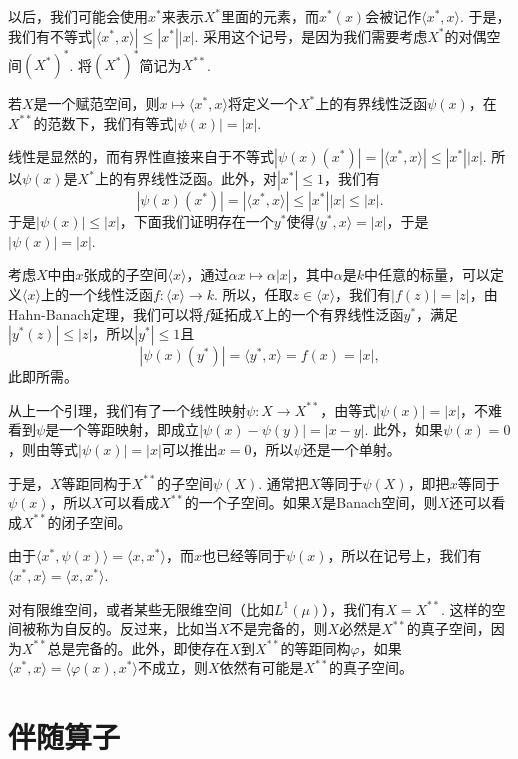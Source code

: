 以后，我们可能会使用$x^*$来表示$X^*$里面的元素，而$x^*(x)$会被记作$\langle x^*,x\rangle$. 于是，我们有不等式$|\langle x^*,x\rangle|\leq |x^*||x|$. 采用这个记号，是因为我们需要考虑$X^*$的对偶空间$(X^*)^*$. 将$(X^*)^*$简记为$X^{**}$.

\begin{lem}
	若$X$是一个赋范空间，则$x\mapsto \langle x^*,x\rangle$将定义一个$X^*$上的有界线性泛函$\psi(x)$，在$X^{**}$的范数下，我们有等式$|\psi(x)|=|x|$.
\end{lem}

线性是显然的，而有界性直接来自于不等式$|\psi(x)(x^*)|=|\langle x^*,x\rangle|\leq |x^*||x|$. 所以$\psi(x)$是$X^*$上的有界线性泛函。此外，对$|x^*|\leq 1$，我们有
\[
	|\psi(x)(x^*)|=|\langle x^*,x\rangle|\leq |x^*||x|\leq |x|.
\]
于是$|\psi(x)|\leq |x|$，下面我们证明存在一个$y^*$使得$\langle y^*,x\rangle=|x|$，于是$|\psi(x)|=|x|$.

考虑$X$中由$x$张成的子空间$\langle x\rangle$，通过$\alpha x\mapsto \alpha|x|$，其中$\alpha$是$k$中任意的标量，可以定义$\langle x\rangle$上的一个线性泛函$f:\langle x\rangle\to k$. 所以，任取$z\in \langle x\rangle$，我们有$|f(z)|=|z|$，由Hahn-Banach定理，我们可以将$f$延拓成$X$上的一个有界线性泛函$y^*$，满足$|y^*(z)|\leq |z|$，所以$|y^*|\leq 1$且
\[
	|\psi(x)(y^*)|=\langle y^*,x\rangle = f(x) =|x|,
\]
此即所需。

\begin{para}
从上一个引理，我们有了一个线性映射$\psi:X\to X^{**}$，由等式$|\psi(x)|=|x|$，不难看到$\psi$是一个等距映射，即成立$|\psi(x)-\psi(y)|=|x-y|$. 此外，如果$\psi(x)=0$，则由等式$|\psi(x)|=|x|$可以推出$x=0$，所以$\psi$还是一个单射。

于是，$X$等距同构于$X^{**}$的子空间$\psi(X)$. 通常把$X$等同于$\psi(X)$，即把$x$等同于$\psi(x)$，所以$X$可以看成$X^{**}$的一个子空间。如果$X$是Banach空间，则$X$还可以看成$X^{**}$的闭子空间。

由于$\langle x^*,\psi(x)\rangle=\langle x,x^*\rangle$，而$x$也已经等同于$\psi(x)$，所以在记号上，我们有$\langle x^*,x\rangle=\langle x,x^*\rangle$. 

对有限维空间，或者某些无限维空间（比如$L^1(\mu)$），我们有$X=X^{**}$. 这样的空间被称为自反的。反过来，比如当$X$不是完备的，则$X$必然是$X^{**}$的真子空间，因为$X^{**}$总是完备的。此外，即使存在$X$到$X^{**}$的等距同构$\varphi$，如果$\langle x^*,x\rangle=\langle \varphi(x),x^*\rangle$不成立，则$X$依然有可能是$X^{**}$的真子空间。
\end{para}

\section{伴随算子}